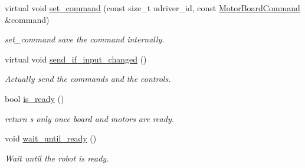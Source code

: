 \begin{DoxyCompactItemize}
virtual void \hyperlink{classblmc__drivers_1_1SpiBus_af5ca19baccb36befbbc697cdd2e2922c}{set\+\_\+command} (const size\+\_\+t udriver\+\_\+id, const \hyperlink{classblmc__drivers_1_1MotorBoardCommand}{Motor\+Board\+Command} \&command)
\begin{DoxyCompactList}\small\item\em set\+\_\+command save the command internally. \end{DoxyCompactList}\item 
virtual void \hyperlink{classblmc__drivers_1_1SpiBus_ab3802bb10a387b14c7cedc9175823421}{send\+\_\+if\+\_\+input\+\_\+changed} ()
\begin{DoxyCompactList}\small\item\em Actually send the commands and the controls. \end{DoxyCompactList}\item 
bool \hyperlink{classblmc__drivers_1_1SpiBus_ac8c8047626990074b5203ea8010f4570}{is\+\_\+ready} ()\hypertarget{classblmc__drivers_1_1SpiBus_ac8c8047626990074b5203ea8010f4570}{}\label{classblmc__drivers_1_1SpiBus_ac8c8047626990074b5203ea8010f4570}

\begin{DoxyCompactList}\small\item\em return s only once board and motors are ready. \end{DoxyCompactList}\item 
void \hyperlink{classblmc__drivers_1_1SpiBus_a1ff5ba883178951fdd4cc2c5d41d2342}{wait\+\_\+until\+\_\+ready} ()\hypertarget{classblmc__drivers_1_1SpiBus_a1ff5ba883178951fdd4cc2c5d41d2342}{}\label{classblmc__drivers_1_1SpiBus_a1ff5ba883178951fdd4cc2c5d41d2342}

\begin{DoxyCompactList}\small\item\em Wait until the robot is ready. \end{DoxyCompactList}\end{DoxyCompactItemize}
